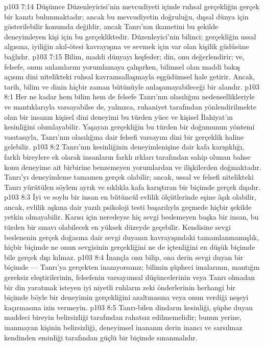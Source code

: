 \vs p103 7:14 Düşümce Düzenleyicisi’nin mevcudiyeti içinde ruhsal gerçekliğin gerçek bir kanıtı bulunmaktadır; ancak bu mevcudiyetin doğruluğu, dışsal dünya için gösterilebilir konumda değildir, ancak Tanrı’nın ikametini bu şekilde deneyimleyen kişi için bu gerçekliktedir. Düzenleyici’nin bilinci; gerçekliğin ussal algısına, iyiliğin akıl\hyp{}ötesi kavrayışına ve sevmek için var olan kişilik güdüsüne bağlıdır.
\vs p103 7:15 Bilim, maddi dünyayı keşfeder; din, onu değerlendirir; ve, felsefe, onun anlamlarını yorumlamaya çalışırken, bilimsel olan maddi bakış açısını dini nitelikteki ruhsal kavramsallaşmayla eşgüdümsel hale getirir. Ancak, tarih, bilim ve dinin hiçbir zaman bütünüyle anlaşamayabileceği bir alandır.
\vs p103 8:1 Her ne kadar hem bilim hem de felsefe Tanrı’nın olasılığını nedensellikleriyle ve mantıklarıyla varsayabilse de, yalnızca, ruhaniyet tarafından yönlendirilmekte olan bir insanın kişisel dini deneyimi bu türden yüce ve kişisel İlahiyat’ın kesinliğini olumlayabilir. Yaşayan gerçekliğin bu türden bir doğumunun yöntemi vasıtasıyla, Tanrı’nın olasılığına dair felsefi varsayım dini bir gerçeklik haline gelebilir.
\vs p103 8:2 Tanrı’nın kesinliğinin deneyimlenişine dair kafa karışıklığı, farklı bireylere ek olarak insanların farklı ırkları tarafından sahip olunan bahse konu deneyime ait birbirine benzemeyen yorumlardan ve ilişkilerden doğmaktadır. Tanrı’yı deneyimleme tamamen gerçek olabilir; ancak, ussal ve felsefi nitelikteki Tanrı  yürütülen söylem ayrık ve sıklıkla kafa karıştıran bir biçimde gerçek dışıdır.
\vs p103 8:3 İyi ve soylu bir insan en bütüncül evlilik ölçütlerinde eşine âşık olabilir, ancak, evlilik aşkına dair yazılı psikoloji testi başarılıyla geçmede hiçbir şekilde yetkin olmayabilir. Karısı için neredeyse hiç sevgi beslemeyen başka bir insan, bu türden bir sınavı olabilecek en yüksek düzeyde geçebilir. Kendisine sevgi beslenenin gerçek doğasına dair sevgi duyanın kavrayışındaki tamamlanmamışlık, hiçbir biçimde ne onun sevgisinin gerçekliğini ne de içtenliğini en düşük biçimde bile gerçek dışı kılmaz.
\vs p103 8:4 İnançla onu bilip, ona derin sevgi duyan bir biçimde --- Tanrı’ya gerçekten inanıyorsanız; bilimin şüpheci imalarının, mantığın gereksiz eleştirilerinin, felsefenin varsayımsal düşüncelerinin veya Tanrı olmadan bir din yaratmak isteyen iyi niyetli ruhların zeki önderlerinin herhangi bir biçimde böyle bir deneyimin gerçekliğini azaltmasına veya onun verdiği neşeyi kaçırmasına izin vermeyin.
\vs p103 8:5 Tanrı\hyp{}bilen dindarın kesinliği, şüphe duyan maddeci bireyin belirsizliği tarafından rahatsız edilmemelidir; bunun yerine, inanmayan kişinin belirsizliği, deneyimsel inananın derin inancı ve sarsılmaz kendinden eminliği tarafından güçlü bir biçimde sınanmalıdır.
